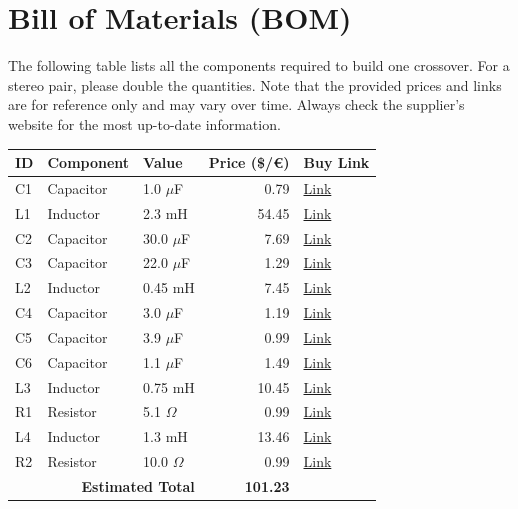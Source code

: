 \documentclass[11pt,a4paper]{report}
\begin{document}
\chapter{Bill of Materials (BOM)}
The following table lists all the components required to build one crossover. For a stereo pair, please double the quantities. Note that the provided prices and links are for reference only and may vary over time. Always check the supplier's website for the most up-to-date information.

\vspace{0.5cm}
\begin{table}[H]
    \centering
    \renewcommand{\arraystretch}{1.5}
    \begin{tabular}{@{}lllrl@{}}
        \toprule
        \textbf{ID} & \textbf{Component} & \textbf{Value} & \textbf{Price (\$/€)} & \textbf{Buy Link} \\
        \midrule
        C1 & Capacitor & 1.0 $\mu$F & 0.79 & \href{https://www.parts-express.com/Dayton-Audio-PMPC-1.0-1.0uF-250V-Precision-Audio-Capacitor-027-210}{Link} \\
        L1 & Inductor & 2.3 mH & 54.45 & \href{https://www.soundimports.eu/en/jantzen-audio-000-8690.html}{Link} \\
        C2 & Capacitor & 30.0 $\mu$F & 7.69 & \href{https://www.parts-express.com/Solen-30uF-400V-Polypropylene-Capacitor-027-590}{Link} \\
        C3 & Capacitor & 22.0 $\mu$F & 1.29 & \href{https://www.parts-express.com/22uF-100V-Non-Polarized-Capacitor-027-348}{Link} \\
        L2 & Inductor & 0.45 mH & 7.45 & \href{https://www.soundimports.eu/en/jantzen-audio-000-2367.html}{Link} \\
        C4 & Capacitor & 3.0 $\mu$F & 1.19 & \href{https://www.parts-express.com/Solen-3.0uF-400V-Polypropylene-Capacitor-027-542}{Link} \\
        C5 & Capacitor & 3.9 $\mu$F & 0.99 & \href{https://www.soundimports.eu/en/jantzen-audio-001-6020.html}{Link} \\
        C6 & Capacitor & 1.1 $\mu$F & 1.49 & \href{https://www.soundimports.eu/en/jantzen-audio-001-0232.html}{Link} \\
        L3 & Inductor & 0.75 mH & 10.45 & \href{https://www.soundimports.eu/en/jantzen-audio-000-1075.html}{Link} \\
        R1 & Resistor & 5.1 $\Omega$ & 0.99 & \href{https://www.soundimports.eu/en/jantzen-audio-002-0781.html}{Link} \\
        L4 & Inductor & 1.3 mH & 13.46 & \href{https://www.soundimports.eu/en/jantzen-audio-000-5005.html}{Link} \\
        R2 & Resistor & 10.0 $\Omega$ & 0.99 & \href{https://www.soundimports.eu/en/jantzen-audio-002-0802.html}{Link} \\
        \midrule
        \multicolumn{3}{r}{\textbf{Estimated Total}} & \textbf{101.23} & \\
        \bottomrule
    \end{tabular}
\end{table}
\end{document}
